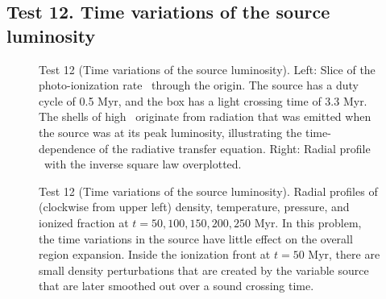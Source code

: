 \documentclass[useAMS,usenatbib]{mn2e}
\begin{document}


\subsection{Test 12. Time variations of the source luminosity}

\begin{figure*}
  \caption{\label{fig:test12_kph} Test 12 (Time variations of the
    source luminosity).  Left: Slice of the photo-ionization rate
    \kph~through the origin.  The source has a duty cycle of 0.5 Myr,
    and the box has a light crossing time of 3.3 Myr.  The shells of
    high \kph~originate from radiation that was emitted when the
    source was at its peak luminosity, illustrating the
    time-dependence of the radiative transfer equation.  Right: Radial
    profile \kph~with the inverse square law overplotted.}
\end{figure*}

\begin{figure}
  \caption{\label{fig:test12_profiles} Test 12 (Time variations of the
    source luminosity).  Radial profiles of (clockwise from upper
    left) density, temperature, pressure, and ionized fraction at $t =
    50, 100, 150, 200, 250$ Myr.  In this problem, the time variations
    in the source have little effect on the overall \hii region
    expansion.  Inside the ionization front at $t = 50$ Myr, there are
    small density perturbations that are created by the variable
    source that are later smoothed out over a sound crossing time.}
\end{figure}
\end{document}
